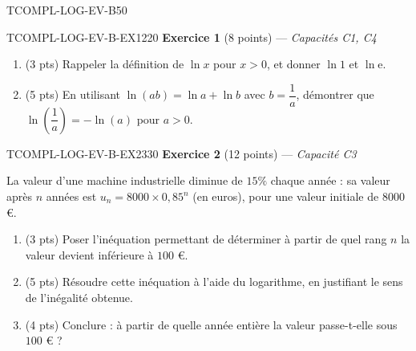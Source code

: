 

\begin{evaluation}{TCOMPL-LOG-EV-B}{50}

\begin{exercice}{TCOMPL-LOG-EV-B-EX1}{2}{20}
\textbf{Exercice 1} (8 points) --- \textit{Capacités C1, C4}

\medskip

\begin{enumerate}
  \item (3 pts) Rappeler la définition de $\ln x$ pour $x>0$, et donner $\ln 1$ et $\ln \mathrm{e}$.
  \item (5 pts) En utilisant $\ln(ab)=\ln a+\ln b$ avec $b=\dfrac{1}{a}$, démontrer que $\ln\!\left(\dfrac{1}{a}\right) = -\ln(a)$ pour $a>0$.
\end{enumerate}
\end{exercice}

\begin{exercice}{TCOMPL-LOG-EV-B-EX2}{3}{30}
\textbf{Exercice 2} (12 points) --- \textit{Capacité C3}

\medskip

La valeur d'une machine industrielle diminue de $15\%$ chaque année : sa valeur après $n$ années est $u_n = 8000 \times 0{,}85^n$ (en euros), pour une valeur initiale de $8000$ €.
\begin{enumerate}
  \item (3 pts) Poser l'inéquation permettant de déterminer à partir de quel rang $n$ la valeur devient inférieure à $100$ €.
  \item (5 pts) Résoudre cette inéquation à l'aide du logarithme, en justifiant le sens de l'inégalité obtenue.
  \item (4 pts) Conclure : à partir de quelle année entière la valeur passe-t-elle sous $100$ € ?
\end{enumerate}
\end{exercice}

\end{evaluation}

